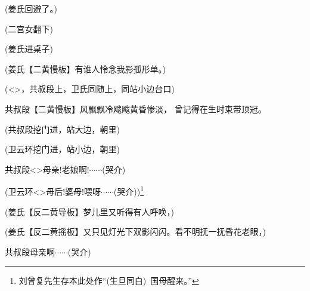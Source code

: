 {(姜氏\hspace{25pt}回避了。)

({\hwfs 二}宫女{\hwfs 翻下})


(姜氏{\hwfs 进桌子})

(姜氏\hspace{25pt}【{\akai 二黄慢板}】有谁人怜念我影孤形单。)

(\textless{}\!\textgreater{}，共叔段{\hwfs 上}，卫氏{\hwfs 同随上}，{\hwfs 同站小边台口})

共叔段\hspace{20pt}【{\akai 二黄慢板}】风飘飘冷飕飕黄昏惨淡， 曾记得在生时束带顶冠。

(共叔段{\hwfs 挖门进}，{\hwfs 站大边}，{\hwfs 朝里})
   

(卫云环{\hwfs 挖门进}，{\hwfs 站小边}，{\hwfs 朝里})

共叔段\hspace{20pt}\textless{}\!\textgreater{}母亲!老娘啊!$\cdots${}$\cdots{}$({\hwfs 哭介})

(卫云环\hspace{15pt}\textless{}\!\textgreater{}母后!婆母!喂呀$\cdots${}$\cdots{}$({\hwfs 哭介}))\footnote{刘曾复先生存本此处作``(生旦同白)~国母醒来。''}%

(姜氏\hspace{25pt}【{\akai 反二黄导板}】梦儿里又听得有人呼唤，)

(姜氏\hspace{25pt}【{\akai 反二黄摇板}】又只见灯光下双影闪闪。看不明抚一抚昏花老眼，)

共叔段\hspace{20pt}母亲啊$\cdots${}$\cdots{}$({\hwfs 哭介})

}
